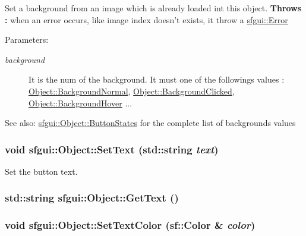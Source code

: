 Set a background from an image which is already loaded int this object. {\bf Throws : }when an error occurs, like image index doesn't exists, it throw a \hyperlink{classsfgui_1_1Error}{sfgui::Error} \begin{Desc}
\item[Parameters:]
\begin{description}
\item[{\em background}]It is the num of the background. It must one of the followings values : \hyperlink{classsfgui_1_1Object_8a7d7ae20a88b7ef8a104f7e6c8596cee8211d79a1f35d08db2b31a914bddc38}{Object::BackgroundNormal}, \hyperlink{classsfgui_1_1Object_8a7d7ae20a88b7ef8a104f7e6c8596ce03b529b6f0fee7ab7cc0033441180b67}{Object::BackgroundClicked}, \hyperlink{classsfgui_1_1Object_8a7d7ae20a88b7ef8a104f7e6c8596ce9befc9dbae9107e3e7546af33a139df9}{Object::BackgroundHover} ... \end{description}
\end{Desc}
\begin{Desc}
\item[See also:]\hyperlink{classsfgui_1_1Object_8a7d7ae20a88b7ef8a104f7e6c8596ce}{sfgui::Object::ButtonStates} for the complete list of backgrounds values \end{Desc}
\hypertarget{classsfgui_1_1Object_64c05d85588778a652d11c7a1daf8db0}{
\subsubsection[SetText]{\setlength{\rightskip}{0pt plus 5cm}void sfgui::Object::SetText (std::string {\em text})}}
\label{classsfgui_1_1Object_64c05d85588778a652d11c7a1daf8db0}




Set the button text. \hypertarget{classsfgui_1_1Object_070ede7cda0e7b3cab312aac5013a206}{
\subsubsection[GetText]{\setlength{\rightskip}{0pt plus 5cm}std::string sfgui::Object::GetText ()}}
\label{classsfgui_1_1Object_070ede7cda0e7b3cab312aac5013a206}


\hypertarget{classsfgui_1_1Object_88f1c97f50dd466417309f0776dce452}{
\subsubsection[SetTextColor]{\setlength{\rightskip}{0pt plus 5cm}void sfgui::Object::SetTextColor (sf::Color \& {\em color})}}
\label{classsfgui_1_1Object_88f1c97f50dd466417309f0776dce452}


